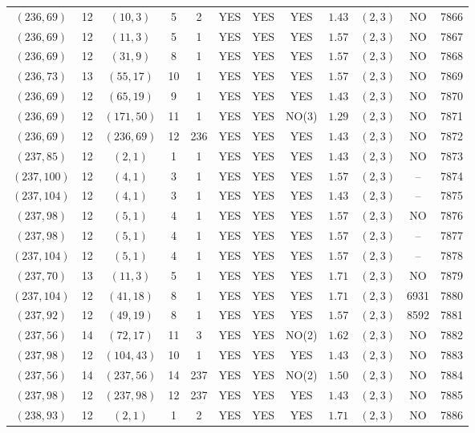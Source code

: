 \begin{longtable}{|c|c|c|c|c|c|c|c|c|c|c|c|}
$(236,69)$ & 12 & $(10,3)$ & 5 & 2 & YES & YES & YES & $1.43$ & $(2,3)$ & NO & 7866\\
$(236,69)$ & 12 & $(11,3)$ & 5 & 1 & YES & YES & YES & $1.57$ & $(2,3)$ & NO & 7867\\
$(236,69)$ & 12 & $(31,9)$ & 8 & 1 & YES & YES & YES & $1.57$ & $(2,3)$ & NO & 7868\\
$(236,73)$ & 13 & $(55,17)$ & 10 & 1 & YES & YES & YES & $1.57$ & $(2,3)$ & NO & 7869\\
$(236,69)$ & 12 & $(65,19)$ & 9 & 1 & YES & YES & YES & $1.43$ & $(2,3)$ & NO & 7870\\
$(236,69)$ & 12 & $(171,50)$ & 11 & 1 & YES & YES & NO(3) & $1.29$ & $(2,3)$ & NO & 7871\\
$(236,69)$ & 12 & $(236,69)$ & 12 & 236 & YES & YES & YES & $1.43$ & $(2,3)$ & NO & 7872\\
$(237,85)$ & 12 & $(2,1)$ & 1 & 1 & YES & YES & YES & $1.43$ & $(2,3)$ & NO & 7873\\
$(237,100)$ & 12 & $(4,1)$ & 3 & 1 & YES & YES & YES & $1.57$ & $(2,3)$ & -- & 7874\\
$(237,104)$ & 12 & $(4,1)$ & 3 & 1 & YES & YES & YES & $1.43$ & $(2,3)$ & -- & 7875\\
$(237,98)$ & 12 & $(5,1)$ & 4 & 1 & YES & YES & YES & $1.57$ & $(2,3)$ & NO & 7876\\
$(237,98)$ & 12 & $(5,1)$ & 4 & 1 & YES & YES & YES & $1.57$ & $(2,3)$ & -- & 7877\\
$(237,104)$ & 12 & $(5,1)$ & 4 & 1 & YES & YES & YES & $1.57$ & $(2,3)$ & -- & 7878\\
$(237,70)$ & 13 & $(11,3)$ & 5 & 1 & YES & YES & YES & $1.71$ & $(2,3)$ & NO & 7879\\
$(237,104)$ & 12 & $(41,18)$ & 8 & 1 & YES & YES & YES & $1.71$ & $(2,3)$ & 6931 & 7880\\
$(237,92)$ & 12 & $(49,19)$ & 8 & 1 & YES & YES & YES & $1.57$ & $(2,3)$ & 8592 & 7881\\
$(237,56)$ & 14 & $(72,17)$ & 11 & 3 & YES & YES & NO(2) & $1.62$ & $(2,3)$ & NO & 7882\\
$(237,98)$ & 12 & $(104,43)$ & 10 & 1 & YES & YES & YES & $1.43$ & $(2,3)$ & NO & 7883\\
$(237,56)$ & 14 & $(237,56)$ & 14 & 237 & YES & YES & NO(2) & $1.50$ & $(2,3)$ & NO & 7884\\
$(237,98)$ & 12 & $(237,98)$ & 12 & 237 & YES & YES & YES & $1.43$ & $(2,3)$ & NO & 7885\\
$(238,93)$ & 12 & $(2,1)$ & 1 & 2 & YES & YES & YES & $1.71$ & $(2,3)$ & NO & 7886\\

\end{longtable}
